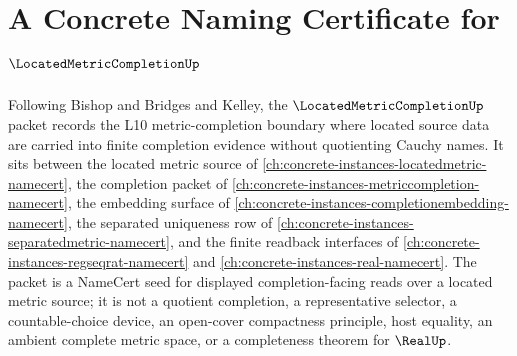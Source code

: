 \chapter{A Concrete Naming Certificate for $\LocatedMetricCompletionUp$}
\label{ch:concrete-instances-located-metric-completion-namecert}

Following Bishop and Bridges and Kelley, the $\LocatedMetricCompletionUp$ packet records the L10 metric-completion boundary where located source data are carried into finite completion evidence without quotienting Cauchy names. It sits between the located metric source of \autoref{ch:concrete-instances-locatedmetric-namecert}, the completion packet of \autoref{ch:concrete-instances-metriccompletion-namecert}, the embedding surface of \autoref{ch:concrete-instances-completionembedding-namecert}, the separated uniqueness row of \autoref{ch:concrete-instances-separatedmetric-namecert}, and the finite readback interfaces of \autoref{ch:concrete-instances-regseqrat-namecert} and \autoref{ch:concrete-instances-real-namecert}. The packet is a NameCert seed for displayed completion-facing reads over a located metric source; it is not a quotient completion, a representative selector, a countable-choice device, an open-cover compactness principle, host equality, an ambient complete metric space, or a completeness theorem for $\RealUp$.

